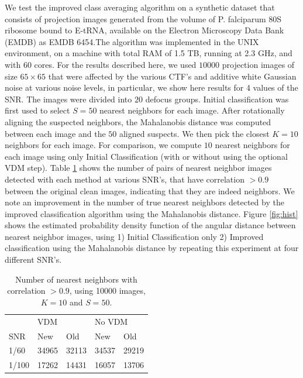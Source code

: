 \documentclass{article}
\begin{document}
We test the improved class averaging algorithm on a synthetic dataset that consists of projection images generated from the volume of P. falciparum 80S ribosome bound to E-tRNA, available on the Electron Microscopy Data Bank (EMDB) as EMDB 6454.The algorithm was implemented in the UNIX environment, on a machine with total RAM of 1.5 TB, running at 2.3 GHz, and with 60 cores. 
For the results described here, we used $10000$ projection images of size $65 \times 65$ that were affected by the various CTF's and additive white Gaussian noise at various noise levels, in particular, we show here results for 4 values of the SNR. The images were divided into $20$ defocus groups. Initial classification was first used to select $S=50$ nearest neighbors for each image. After rotationally aligning the suspected neighbors, the Mahalanobis distance was computed between each image and the $50$ aligned suspects. We then pick the closest $K=10$ neighbors for each image. For comparison, we compute $10$ nearest neighbors for each image using only Initial Classification (with or without using the optional VDM step). Table \ref{table:1} shows the number of pairs of nearest neighbor images detected with each method at various SNR's, that have correlation $>0.9$ between the original clean images, indicating that they are indeed neighbors. We note an improvement in the number of true nearest neighbors detected by the improved classification algorithm using the Mahalanobis distance. Figure \ref{fig:hist} shows the estimated probability density function of the angular distance between nearest neighbor images, using 1) Initial Classification only 2) Improved classification using the Mahalanobis distance by repeating this experiment at four different SNR's. 

\begin{table}[]
\centering
\caption{Number of nearest neighbors with correlation $>0.9$, 
using 10000 images, $K=10$ and $S=50$.
}
\label{table:1}
\begin{tabular}{lllll}
      & \multicolumn{2}{l}{VDM} & \multicolumn{2}{l}{No VDM} \\ \cline{2-5} 
SNR   & New        & Old        & New          & Old         \\ \cline{2-5} 
1/60  & 34965          & 32113          & 34537            & 29219       \\
1/100 & 17262      & 14431      & 16057        & 13706        \\ \cline{2-5} 
\end{tabular}
\end{table}
\end{document}
